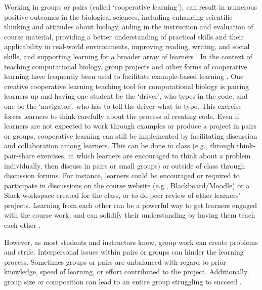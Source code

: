 Working in groups or pairs (called `cooperative learning'), can result in numerous positive outcomes in the biological sciences, including enhancing scientific thinking and attitudes about biology, aiding in the instruction and evaluation of course material, providing a better understanding of practical skills and their applicability in real-world environments, improving reading, writing, and social skills, and supporting learning for a broader array of learners \citep[reviewed in][]{lord_101_2001}. 
In the context of teaching computational biology, group projects and other forms of cooperative learning have frequently been used to facilitate example-based learning  \citep[e.g.,][]{emery_application_2017,korcsmaros_teaching_2013,fuselier_trace_2011}.
One creative cooperative learning teaching tool for computational biology is pairing learners up and having one student be the `driver', who types in the code, and one be the `navigator', who has to tell the driver what to type. 
This exercise forces learners to think carefully about the process of creating code.
Even if learners are not expected to work through examples or produce a project in pairs or groups, cooperative learning can still be implemented by facilitating discussion and collaboration among learners.
This can be done in class (e.g., through think-pair-share exercises, in which learners are encouraged to think about a problem individually, then discuss in pairs or small groups) or outside of class through discussion forums.
For instance, learners could be encouraged or required to participate in discussions on the course website (e.g., Blackboard/Moodle) or a Slack workspace created for the class, or to do peer review of other learners' projects. 
Learning from each other can be a powerful way to get learners engaged with the course work, and can solidify their understanding by having them teach each other \citep{treisman1992studying}.

However, as most students and instructors know, group work can create problems and strife.
Interpersonal issues within pairs or groups can hinder the learning process.
Sometimes groups or pairs are unbalanced with regard to prior knowledge, speed of learning, or effort contributed to the project.
Additionally, group size or composition can lead to an entire group struggling to succeed \citep[e.g.,][]{compeau_establishing_2019}. 

